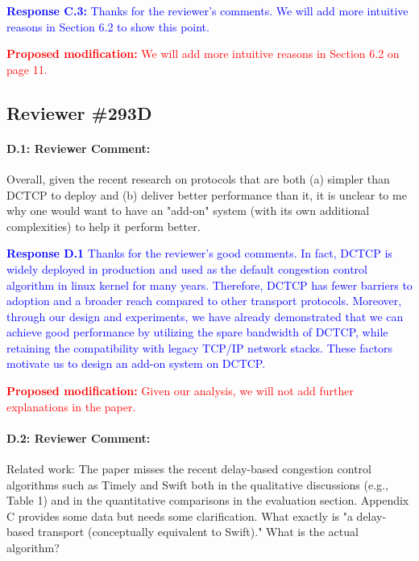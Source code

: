 \documentclass[12pt,one-column]{article}
\begin{document}
\noindent\textcolor{blue}{\textbf{Response C.3:}
Thanks for the reviewer's comments. 
We will add more intuitive reasons in Section 6.2 to show this point.
}

\noindent\textcolor{red}{\textbf{Proposed modification: }
We will add more intuitive reasons in Section 6.2 on page 11.
}

\subsection{Reviewer \#293D}

{\it \paragraph{D.1: Reviewer Comment:}Overall, given the recent research on protocols that are both (a) simpler than DCTCP to deploy and (b) deliver better performance than it, it is unclear to me why one would want to have an "add-on" system (with its own additional complexities) to help it perform better.}

\noindent\textcolor{blue}{\textbf{Response D.1}
Thanks for the reviewer's good comments.
In fact, DCTCP is widely deployed in production and used as the default congestion control algorithm in linux kernel for many years.
Therefore, DCTCP has fewer barriers to adoption and a broader reach compared to other transport protocols.
Moreover, through our design and experiments, we have already demonstrated that we can achieve good performance by utilizing the spare bandwidth of DCTCP, while retaining the compatibility with legacy TCP/IP network stacks.
These factors motivate us to design an add-on system on DCTCP.
} 

\noindent\textcolor{red}{\textbf{Proposed modification: }
	Given our analysis, we will not add further explanations in the paper.
}

{\it \paragraph{D.2: Reviewer Comment:}Related work: The paper misses the recent delay-based congestion control algorithms such as Timely and Swift both in the qualitative discussions (e.g., Table 1) and in the quantitative comparisons in the evaluation section. Appendix C provides some data but needs some clarification. What exactly is "a delay-based transport (conceptually equivalent to Swift)." What is the actual algorithm?}
\end{document}
